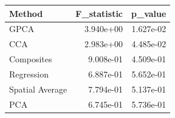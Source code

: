 \begin{tabular}{lrr}
\toprule
Method & F_statistic & p_value \\
\midrule
GPCA & 3.940e+00 & 1.627e-02 \\
CCA & 2.983e+00 & 4.485e-02 \\
Composites & 9.008e-01 & 4.509e-01 \\
Regression & 6.887e-01 & 5.652e-01 \\
Spatial Average & 7.794e-01 & 5.137e-01 \\
PCA & 6.745e-01 & 5.736e-01 \\
\bottomrule
\end{tabular}
